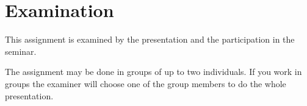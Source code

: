 \documentclass[a4paper]{llncs}
\begin{document}
\section{Examination}%
\label{sec:Examination}

This assignment is examined by the presentation and the participation in the 
seminar.

The assignment may be done in groups of up to two individuals.
If you work in groups the examiner will choose one of the group members to do 
the whole presentation.


\printbibliography{}
\end{document}
